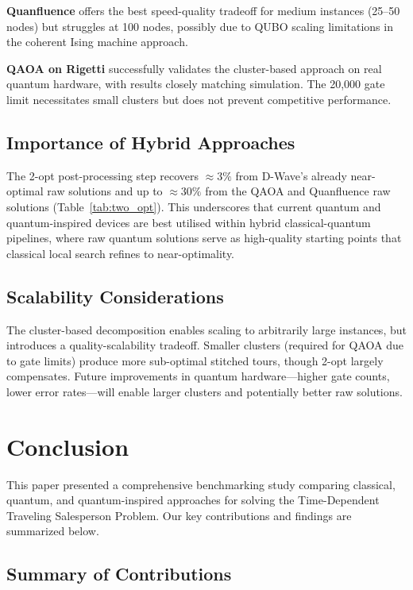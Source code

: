 \documentclass[conference]{IEEEtran}
\begin{document}
\textbf{Quanfluence} offers the best speed-quality tradeoff for medium instances (25--50 nodes) but struggles at 100 nodes, possibly due to QUBO scaling limitations in the coherent Ising machine approach.

\textbf{QAOA on Rigetti} successfully validates the cluster-based approach on real quantum hardware, with results closely matching simulation. The 20,000 gate limit necessitates small clusters but does not prevent competitive performance.

\subsection{Importance of Hybrid Approaches}

The 2-opt post-processing step recovers $\approx 3\%$ from D-Wave's already near-optimal raw solutions and up to $\approx 30\%$ from the QAOA and Quanfluence raw solutions (Table~\ref{tab:two_opt}). This underscores that current quantum and quantum-inspired devices are best utilised within hybrid classical-quantum pipelines, where raw quantum solutions serve as high-quality starting points that classical local search refines to near-optimality.

\subsection{Scalability Considerations}

The cluster-based decomposition enables scaling to arbitrarily large instances, but introduces a quality-scalability tradeoff. Smaller clusters (required for QAOA due to gate limits) produce more sub-optimal stitched tours, though 2-opt largely compensates. Future improvements in quantum hardware---higher gate counts, lower error rates---will enable larger clusters and potentially better raw solutions.

\section{Conclusion}

This paper presented a comprehensive benchmarking study comparing classical, quantum, and quantum-inspired approaches for solving the Time-Dependent Traveling Salesperson Problem. Our key contributions and findings are summarized below.

\subsection{Summary of Contributions}
\end{document}
